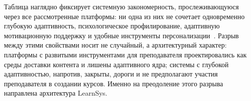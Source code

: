 \begin{table}[H]
\centering
\caption{Сравнительная характеристика образовательных платформ}
\label{tab:comparison}
\end{table}

Таблица наглядно фиксирует системную закономерность,
прослеживающуюся через все рассмотренные платформы: ни одна
из них не сочетает одновременно глубокую адаптивность,
психологическое профилирование, адаптивную мотивационную
поддержку и удобные инструменты
персонализации~\cite{brusilovsky2007usermodels}. Разрыв
между этими свойствами носит не случайный, а архитектурный
характер: платформы с развитыми инструментами для
преподавателя проектировались как среды доставки контента
и лишены адаптивного ядра; системы с глубокой адаптивностью,
напротив, закрыты, дороги и не предполагают участия
преподавателя в создании курсов. Именно на преодоление
этого разрыва направлена архитектура LearnSys.

